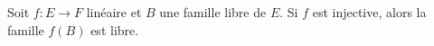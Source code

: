 Soit $f : E \to F$ linéaire et $B$  une famille libre de $E$. Si  $f$ est injective, alors la famille $f(B)$ est  libre.

\begin{reponses}
\end{reponses}

